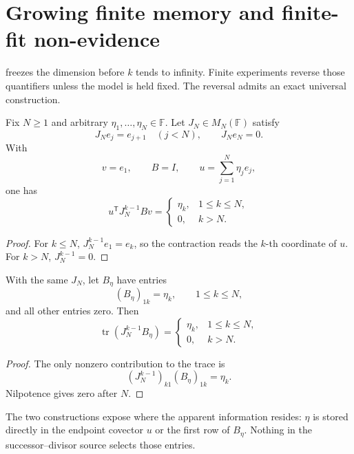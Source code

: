 \section{Growing finite memory and finite-fit non-evidence}
\label{sec:growing}

 freezes the dimension before \(k\) tends to
infinity.  Finite experiments reverse those quantifiers unless the model is
held fixed.  The reversal admits an exact universal construction.

\begin{theorem}
\label{thm:bilmemorizer}
Fix \(N\ge1\) and arbitrary
\(\eta_1,\ldots,\eta_N\in\mathbb F\).  Let
\(J_N\in M_N(\mathbb F)\) satisfy
\[
 J_Ne_j=e_{j+1}\quad(j<N),\qquad J_Ne_N=0.
\]
With
\[
        v=e_1,\qquad B=I,\qquad
        u=\sum_{j=1}^N\eta_je_j,
\]
one has
\[
 u^{\mathsf T}J_N^{k-1}Bv
 =
 \begin{cases}
 \eta_k,&1\le k\le N,\\
 0,&k>N.
 \end{cases}
\]
\end{theorem}

\begin{proof}
For \(k\le N\), \(J_N^{k-1}e_1=e_k\), so the contraction reads the \(k\)-th
coordinate of \(u\).  For \(k>N\), \(J_N^{k-1}=0\).
\end{proof}

\begin{theorem}
\label{thm:trmemorizer}
With the same \(J_N\), let \(B_\eta\) have entries
\[
        (B_\eta)_{1k}=\eta_k,\qquad 1\le k\le N,
\]
and all other entries zero.  Then
\[
 \operatorname{tr}(J_N^{k-1}B_\eta)
 =
 \begin{cases}
 \eta_k,&1\le k\le N,\\
 0,&k>N.
 \end{cases}
\]
\end{theorem}

\begin{proof}
The only nonzero contribution to the trace is
\[
        (J_N^{k-1})_{k1}(B_\eta)_{1k}=\eta_k.
\]
Nilpotence gives zero after \(N\).
\end{proof}

The two constructions expose where the apparent information resides:
\(\eta\) is stored directly in the endpoint covector \(u\) or the first row
of \(B_\eta\).  Nothing in the successor--divisor source selects those
entries.

